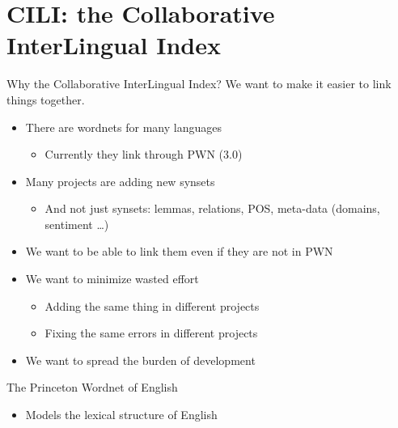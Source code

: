 \documentclass{beamer}
\begin{document}
\section{CILI: the Collaborative InterLingual Index}
\begin{frame}{Why the Collaborative InterLingual Index?}
We want to make it easier to link things together.
  \begin{itemize}
  \item There are wordnets for many languages
    \begin{itemize}
    \item Currently they link through PWN (3.0)
    \end{itemize}
  \item Many projects are adding new synsets 
    \begin{itemize}
    \item And not just synsets: lemmas, relations, POS, meta-data
      (domains, sentiment \ldots)
    \end{itemize}
  \item We want to be able to link them even if they are not in PWN
  \item We want to minimize wasted effort
    \begin{itemize}
    \item Adding the same thing in different projects
    \item Fixing the same errors in different projects
    \end{itemize}
  \item We want to spread the burden of development
  \end{itemize}
  
\end{frame}



\begin{frame}{The Princeton Wordnet of English}

  \begin{center}
  \end{center}
    \begin{itemize}
    \item Models the lexical structure of English
    \end{itemize}

  \end{frame} 
  
\end{document}
